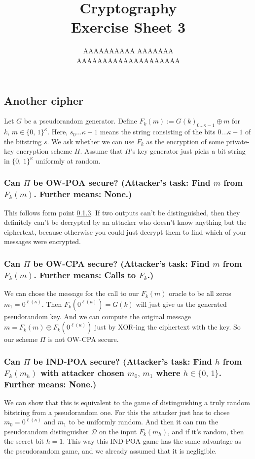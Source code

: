 \documentclass{article}
\title{Cryptography \\ Exercise Sheet 3}
\author{
  AAAAAAAAAA AAAAAAA \\
  \href{mailto:AAAAAAAAAAAAAAAAAAAA}{AAAAAAAAAAAAAAAAAAAA}
}
\begin{document}
  \maketitle

  \setcounter{section}{3}
  \subsection{Another cipher}
  \begin{centerframebox}
    Let $G$ be a pseudorandom generator. Define $F_k(m) := G(k)_{0\dots\kappa-1} \oplus m$ for
    $k,\, m \in \{0,\, 1\}^\kappa$.
    Here, $s_0 \dots \kappa-1$ means the string consisting of the bits $0 \dots \kappa-1$
    of the bitstring $s$. We ask whether we can use $F_k$ as the encryption of
    some private-key encryption scheme $\Pi$. Assume that $\Pi$'s key generator
    just picks a bit string in $\{0,\, 1\}^\kappa$
    uniformly at random.
  \end{centerframebox}
  \subsubsection{Can $\Pi$ be OW-POA secure? (Attacker's task: Find $m$ from $F_k(m)$. Further means: None.)}
  This follows form point \ref{sec:indpoasec}.
  If two outputs can't be distinguished, then they definitely can't be decrypted by an attacker who doesn't know anything but the ciphertext, because otherwise you could just decrypt them to find which of your messages were encrypted.

  \subsubsection{Can $\Pi$ be OW-CPA secure? (Attacker's task: Find $m$ from $F_k(m)$. Further means: Calls to $F_k$.)}
  We can chose the message for the call to our $F_k(m)$ oracle to be all zeros $m_1 = 0^{\ell(\kappa)}$.
  Then $F_k\left(0^{\ell(\kappa)}\right) = G(k)$ will just give us the generated pseudorandom key.
  And we can compute the original message $m = F_k(m) \oplus F_k\left(0^{\ell(\kappa)}\right)$ just by XOR-ing the ciphertext with the key.
  So our scheme $\Pi$ is not OW-CPA secure.

  \subsubsection{Can $\Pi$ be IND-POA secure? (Attacker's task: Find $h$ from $F_k(m_h)$ with attacker chosen $m_0,\, m_1$ where $h \in \{0,\, 1\}$. Further means: None.)}
  \label{sec:indpoasec}
  We can show that this is equivalent to the game of distinguishing a truly random bitstring from a pseudorandom one.
  For this the attacker just has to chose $m_0 = 0^{\ell(\kappa)}$ and $m_1$ to be uniformly random.
  And then it can run the pseudorandom distinguisher $\mathcal{D}$ on the input $F_k(m_h)$,
  and if it's random, then the secret bit $h = 1$.
  This way this IND-POA game has the same advantage as the pseudorandom game, and we already assumed that it is negligible.
\end{document}

